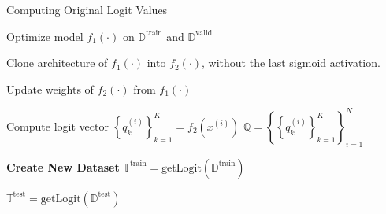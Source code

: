 \documentclass[review,1p,times,numbers]{elsarticle}
\newenvironment{SgAlgorithm}[1][t]
{%
	\begin{algorithm2e}[#1]
    \linespread{1.2}
    \selectfont
}
{\end{algorithm2e}}
\begin{document}
\begin{SgAlgorithm}
    \caption{Computing Original Logit Values}\label{alg:taxonomy.logits}
    \BlankLine%

    {%
        Optimize model $f_1(\cdot)$ on $\mathbb{D}^{\text{train}}$ and $\mathbb{D}^{\text{valid}}$ \;

        Clone architecture of $f_1(\cdot)$ into $f_2(\cdot)$, without the last sigmoid activation. \;

        Update weights of $f_2(\cdot)$ from $f_1(\cdot)$
    }
    \BlankLine%

    {%
        {
            Compute logit vector ${\left\{ q_k^{(i)} \right\}}_{k=1}^K = f_2 \left(x^{(i)}\right)$
        }
        \BlankLine%
        ${\mathbb{Q}} = {\left\{ {\left\{ q_k^{(i)} \right\}}_{k=1}^K \right\}}_{i=1}^N$

    }
    \BlankLine%

    \textbf{Create New Dataset} \;
    ${\mathbb{T}}^\text{train} = \text{getLogit}(\mathbb{D}^\text{train})$ \;

    $\mathbb{T}^\text{test} = \text{getLogit}(\mathbb{D}^\text{test})$ \;
    \BlankLine%


\end{SgAlgorithm}
\end{document}
